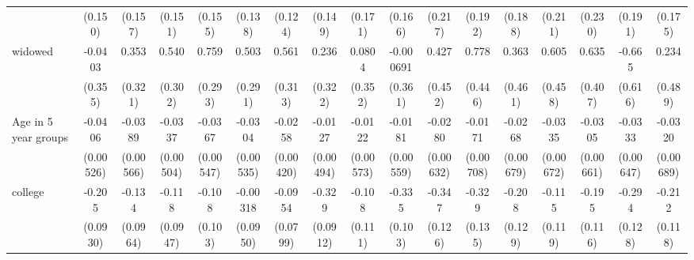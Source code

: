 {\begin{tabular}{l*{16}{c}}
                    &     (0.150)         &     (0.157)         &     (0.151)         &     (0.155)         &     (0.138)         &     (0.124)         &     (0.149)         &     (0.171)         &     (0.166)         &     (0.217)         &     (0.192)         &     (0.188)         &     (0.211)         &     (0.230)         &     (0.191)         &     (0.175)         \\
[1em]
widowed             &     -0.0403         &       0.353         &       0.540         &       0.759\sym{**} &       0.503         &       0.561         &       0.236         &      0.0804         &   -0.000691         &       0.427         &       0.778         &       0.363         &       0.605         &       0.635         &      -0.665         &       0.234         \\
                    &     (0.355)         &     (0.321)         &     (0.302)         &     (0.293)         &     (0.291)         &     (0.313)         &     (0.322)         &     (0.352)         &     (0.361)         &     (0.452)         &     (0.446)         &     (0.461)         &     (0.458)         &     (0.407)         &     (0.616)         &     (0.489)         \\
[1em]
Age in 5 year groups&     -0.0406\sym{***}&     -0.0389\sym{***}&     -0.0337\sym{***}&     -0.0367\sym{***}&     -0.0304\sym{***}&     -0.0258\sym{***}&     -0.0127\sym{*}  &     -0.0122\sym{*}  &     -0.0181\sym{**} &     -0.0280\sym{***}&     -0.0171\sym{*}  &     -0.0268\sym{***}&     -0.0335\sym{***}&     -0.0305\sym{***}&     -0.0333\sym{***}&     -0.0320\sym{***}\\
                    &   (0.00526)         &   (0.00566)         &   (0.00504)         &   (0.00547)         &   (0.00535)         &   (0.00420)         &   (0.00494)         &   (0.00573)         &   (0.00559)         &   (0.00632)         &   (0.00708)         &   (0.00679)         &   (0.00672)         &   (0.00661)         &   (0.00647)         &   (0.00689)         \\
[1em]
college             &      -0.205\sym{*}  &      -0.134         &      -0.118         &      -0.108         &    -0.00318         &     -0.0954         &      -0.329\sym{***}&      -0.108         &      -0.335\sym{**} &      -0.347\sym{**} &      -0.329\sym{*}  &      -0.208         &      -0.115         &      -0.195         &      -0.294\sym{*}  &      -0.212         \\
                    &    (0.0930)         &    (0.0964)         &    (0.0947)         &     (0.103)         &    (0.0950)         &    (0.0799)         &    (0.0912)         &     (0.111)         &     (0.103)         &     (0.126)         &     (0.135)         &     (0.129)         &     (0.119)         &     (0.116)         &     (0.128)         &     (0.118)         \\

\end{tabular}}
